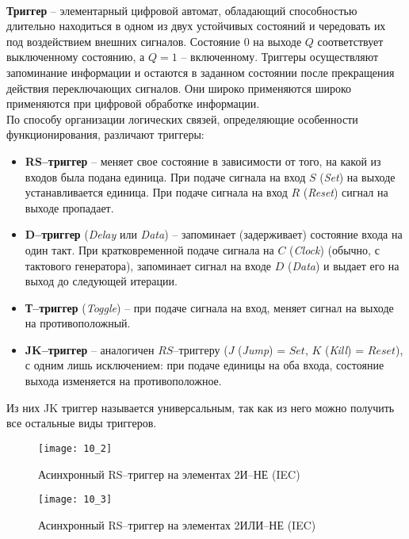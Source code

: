 \\\textbf{Триггер} -- элементарный цифровой автомат, обладающий способностью длительно находиться в одном из двух устойчивых состояний и чередовать их под воздействием внешних сигналов. Состояние $0$ на выходе $Q$ соответствует выключенному состоянию, а $Q = 1$ -- включенному. Триггеры осуществляют запоминание информации и остаются в заданном состоянии после прекращения действия переключающих сигналов. Они широко применяются широко применяются при цифровой обработке информации.
\\По способу организации логических связей, определяющие особенности функционирования, различают триггеры:
\begin{itemize}
  \item \textbf{RS--триггер} -- меняет свое состояние в зависимости от того, на какой из входов была подана единица. При подаче сигнала на вход $S$ (\emph{Set}) на выходе устанавливается единица. При подаче сигнала на вход $R$ (\emph{Reset}) сигнал на выходе пропадает.
  \item  \textbf{D--триггер} (\emph{Delay} или \emph{Data}) -- запоминает (задерживает) состояние входа на один такт. При кратковременной подаче сигнала на $C$ (\emph{Clock}) (обычно, с тактового генератора), запоминает сигнал на входе $D$ (\emph{Data}) и выдает его на выход до следующей итерации.
  \item \textbf{Т--триггер} (\emph{Toggle}) -- при подаче сигнала на вход, меняет сигнал на выходе на противоположный.
  \item \textbf{JK--триггер} -- аналогичен $RS$--триггеру ($J$ (\emph{Jump}) = $Set$, $K$ (\emph{Kill}) = $Reset$), с одним лишь исключением: при подаче единицы на оба входа, состояние выхода изменяется на противоположное.
\end{itemize}
Из них JK триггер называется универсальным, так как из него можно получить все остальные виды триггеров.
\begin{figure}[!h]
\begin{minipage}{5cm}
\texttt{[image: 10\_2]}
\caption{Асинхронный RS--триггер на элементах 2И--НЕ (IEC)}
\end{minipage}
\hfill
\begin{minipage}{5cm}
\texttt{[image: 10\_3]}
\caption{Асинхронный RS--триггер на элементах 2ИЛИ--НЕ (IEC)}
\label{tag:RS_NOR}
\end{minipage}
\end{figure}

